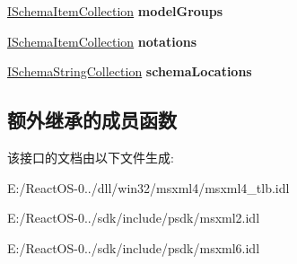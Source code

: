 \begin{DoxyCompactItemize}
\mbox{\label{interface_m_s_x_m_l2_1_1_i_schema_a5d1ad1dbebf79ca242ef0d92ef567bf5}} 
\hyperlink{interface_m_s_x_m_l2_1_1_i_schema_item_collection}{I\+Schema\+Item\+Collection} {\bfseries model\+Groups}
\item 
\mbox{\label{interface_m_s_x_m_l2_1_1_i_schema_ad8384f326eca844f654a77706bfcbbfd}} 
\hyperlink{interface_m_s_x_m_l2_1_1_i_schema_item_collection}{I\+Schema\+Item\+Collection} {\bfseries notations}
\item 
\mbox{\label{interface_m_s_x_m_l2_1_1_i_schema_aed3bc8f499ae8109af428db4aee2f9ac}} 
\hyperlink{interface_m_s_x_m_l2_1_1_i_schema_string_collection}{I\+Schema\+String\+Collection} {\bfseries schema\+Locations}
\end{DoxyCompactItemize}
\subsection*{额外继承的成员函数}


该接口的文档由以下文件生成\+:\begin{DoxyCompactItemize}
\item 
E\+:/\+React\+O\+S-\/0../dll/win32/msxml4/msxml4\+\_\+tlb.\+idl\item 
E\+:/\+React\+O\+S-\/0../sdk/include/psdk/msxml2.\+idl\item 
E\+:/\+React\+O\+S-\/0../sdk/include/psdk/msxml6.\+idl\end{DoxyCompactItemize}
